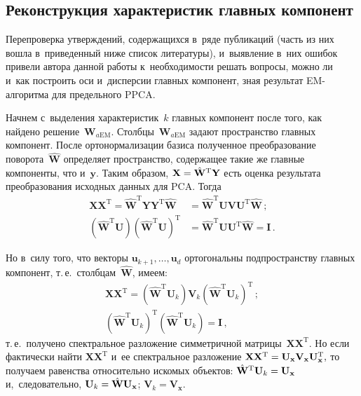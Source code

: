 \begin{multicols}{2}
\section{Реконструкция характеристик главных компонент}

     Перепроверка утверждений, содержащихся в~ряде публикаций (часть из 
них вошла в~приведенный ниже список литературы), и~выявление в~них ошибок 
привели автора данной работы к~необходимости решать вопросы, можно ли 
и~как построить оси и~дисперсии главных компонент, зная результат  
EM-ал\-го\-рит\-ма для предельного PPCA. 
     
     Начнем с~выделения характеристик~$k$ главных компонент после того, 
как найдено решение~$\mathbf{W}_{a\mathrm{EM}}$. Столбцы~$\mathbf{W}_{a\mathrm{EM}}$ 
задают пространство главных\linebreak
 компонент. После ортонормализации базиса 
полученное преобразование поворота~$\hat{\mathbf{W}}$ определяет 
пространство, содержащее такие же главные компоненты, что и~$\mathbf{y}$. 
Таким образом, $\mathbf{X}\hm= \hat{\mathbf{W}}^{\mathrm{T}}\mathbf{Y}$ 
есть оценка результата преобразования исходных данных для PCA. Тогда
     \begin{align*}
     \mathbf{X} \mathbf{X}^{\mathrm{T}} =\hat{\mathbf{W}}^{\mathrm{T}} 
\mathbf{Y} \mathbf{Y}^{\mathrm{T}} \hat{\mathbf{W}} 
&=\hat{\mathbf{W}}^{\mathrm{T}} \mathbf{U} \mathbf{V} 
\mathbf{U}^{\mathrm{T}} \hat{\mathbf{W}}\,;
     \\
     \left( \hat{\mathbf{W}}^{\mathrm{T}} \mathbf{U}\right) \left( 
\hat{\mathbf{W}}^{\mathrm{T}} \mathbf{U}\right)^{\mathrm{T}}& = 
\hat{\mathbf{W}}^{\mathrm{T}} \mathbf{U} \mathbf{U}^{\mathrm{T}} 
\hat{\mathbf{W}} =\mathbf{I}\,.
     \end{align*}
     
     Но в~силу того, что векторы $\mathbf{u}_{k+1},\ldots, \mathbf{u}_d$ 
ортогональны подпространству главных компонент, т.\,е.\ 
столбцам~$\hat{\mathbf{W}}$, имеем:
     \begin{gather*}
     \mathbf{X} \mathbf{X}^{\mathrm{T}} =\left( 
\hat{\mathbf{W}}^{\mathrm{T}} \mathbf{U}_k\right) \mathbf{V}_k \left( 
\hat{\mathbf{W}}^{\mathrm{T}} \mathbf{U}_k\right)^{\mathrm{T}}\,;
     \\
\left( \hat{\mathbf{W}}^{\mathrm{T}} \mathbf{U}_k\right)^{\mathrm{T}} \left( 
\hat{\mathbf{W}}^{\mathrm{T}} \mathbf{U}_k\right)= \mathbf{I}\,,
\end{gather*}
т.\,е.\ получено спектральное разложение симметричной 
матрицы~$\mathbf{X}\mathbf{X}^{\mathrm{T}}$. Но если фактически найти 
$\mathbf{X}\mathbf{X}^{\mathrm{T}}$ и~ее спектральное разложение
     $\mathbf{X}\mathbf{X}^{\mathrm{T}} \hm= \mathbf{U}_{\mathbf{x}} 
\mathbf{V}_{\mathbf{x}} \mathbf{U}_{\mathbf{x}}^{\mathrm{T}},$     
то получаем равенства относительно искомых объектов:
    $\hat{\mathbf{W}}^{\mathrm{T}} \mathbf{U}_k \hm= 
\mathbf{U}_{\mathbf{x}}$ и,~следовательно, $\mathbf{U}_k\hm= 
\hat{\mathbf{W}} \mathbf{U}_{\mathbf{x}}$;
    $\mathbf{V}_k=\mathbf{V}_{\mathbf{x}}$.
        

\end{multicols}
